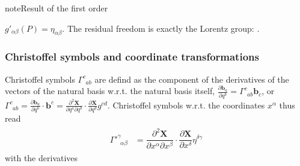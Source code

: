 \documentclass[letterpaper,10pt,english]{jupyterBook}
\begin{document}
\begin{sphinxadmonition}{note}{Result of the first order}

\sphinxAtStartPar
\(g'_{\alpha\beta}(P)=\eta_{\alpha\beta}\). The residual freedom is exactly the Lorentz group: .
\end{sphinxadmonition}
\subsubsection*{Christoffel symbols and coordinate transformations}

\sphinxAtStartPar
Christoffel symbols \(\Gamma^{c}_{\ \ a b}\) are defind as the component of the derivatives of the vectors of the natural basis w.r.t. the natural basis itself, \(\tfrac{\partial \mathbf{b}_a}{\partial q^b} = \Gamma^{c}_{\ \ a b} \mathbf{b}_{c}\), or \(\Gamma^{c}_{\ \ a b} = \tfrac{\partial \mathbf{b}_a}{\partial q^b} \cdot \mathbf{b}^c = \tfrac{\partial^2 \mathbf{X}}{\partial q^a \partial q^b} \cdot \tfrac{\partial \mathbf{X}}{\partial q^d} g^{cd}\). Christoffel symbols w.r.t. the coordinates \(x^\alpha\) thus read
\begin{equation}\label{equation:ch/relativity-general/local-inertial-reference-frame-and-equivalence-principle:eq-gamma-transf}
\begin{split}\begin{aligned}
  {\Gamma'}^{\gamma}_{\ \ \alpha \beta} 
  & = \dfrac{\partial^2 \mathbf{X}}{\partial x^\alpha \partial x^\beta} \cdot \dfrac{\partial \mathbf{X}}{\partial x^\delta} \eta^{\delta \gamma}
\end{aligned}\end{split}
\end{equation}
\sphinxAtStartPar
with the derivatives
\end{document}
